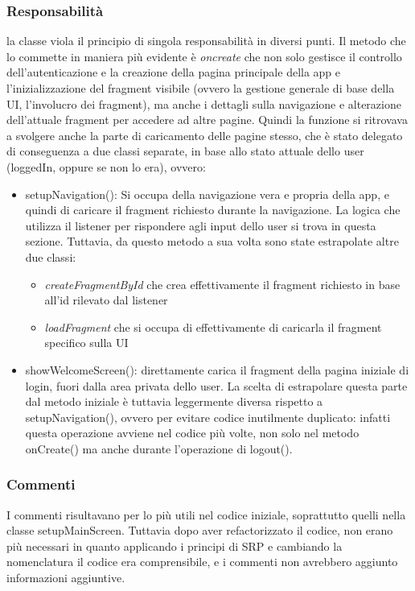 \subsubsection{Responsabilità}
la classe viola il principio di singola responsabilità in diversi punti. Il metodo che lo commette in maniera più evidente è\textit{ oncreate} che non solo gestisce il controllo dell'autenticazione e la creazione della pagina principale della app e l'inizializzazione del fragment visibile (ovvero la gestione generale di base della UI, l'involucro dei fragment), ma anche i dettagli sulla navigazione e alterazione dell'attuale fragment per accedere ad altre pagine. 
Quindi la funzione si ritrovava a svolgere anche la parte di caricamento delle pagine stesso, che è stato delegato di conseguenza a due classi separate, in base allo stato attuale dello user (loggedIn, oppure se non lo era), ovvero:
\begin{itemize}
    \item setupNavigation(): Si occupa della navigazione vera e propria della app, e quindi di caricare il fragment richiesto durante la navigazione. La logica che utilizza il listener per rispondere agli input dello user si trova in questa sezione. Tuttavia, da questo metodo a sua volta sono state estrapolate altre due classi:
    \begin{itemize}
        \item  \textit{createFragmentById} che crea effettivamente il fragment richiesto in base all'id rilevato dal listener 
        \item  \textit{loadFragment} che si occupa di effettivamente di caricarla il fragment specifico sulla UI
    \end{itemize}

    \item showWelcomeScreen(): direttamente carica il fragment della pagina iniziale di login, fuori dalla area     privata dello user. La scelta di estrapolare questa parte dal metodo iniziale è tuttavia leggermente diversa rispetto a setupNavigation(), ovvero per evitare codice inutilmente duplicato: infatti questa operazione avviene nel codice più volte, non solo nel metodo onCreate() ma anche durante l'operazione di logout(). 
\end{itemize}

\subsubsection{Commenti}
I commenti risultavano per lo più utili nel codice iniziale, soprattutto quelli nella classe setupMainScreen. Tuttavia dopo aver refactorizzato il codice, non erano più necessari in quanto applicando i principi di SRP e cambiando la nomenclatura il codice era comprensibile, e i commenti non avrebbero aggiunto informazioni aggiuntive.

